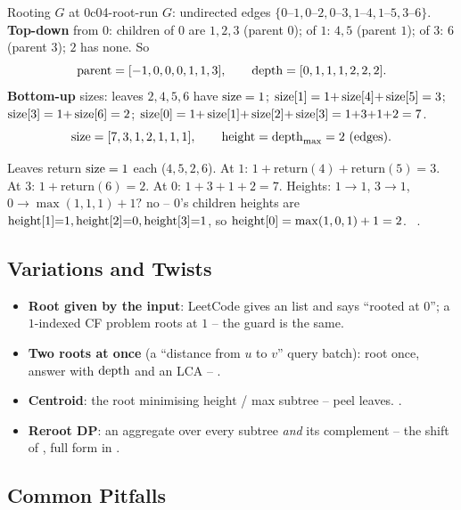 \begin{example}{Rooting $G$ at $0$}{c04-root-run}
$G$: undirected edges $\{0\text{--}1,0\text{--}2,0\text{--}3,1\text{--}4,1\text{--}5,3\text{--}6\}$.
\textbf{Top-down} from $0$: children of $0$ are $1,2,3$ (parent $0$); of $1$: $4,5$
(parent $1$); of $3$: $6$ (parent $3$); $2$ has none. So
\[
  \operatorname{parent}=[-1,0,0,0,1,1,3],\qquad \operatorname{depth}=[0,1,1,1,2,2,2].
\]
\textbf{Bottom-up} sizes: leaves $2,4,5,6$ have $\operatorname{size}=1$; $\operatorname{size}[1]=1{+}\operatorname{size}[4]{+}\operatorname{size}[5]=3$;
$\operatorname{size}[3]=1{+}\operatorname{size}[6]=2$; $\operatorname{size}[0]=1{+}\operatorname{size}[1]{+}\operatorname{size}[2]{+}\operatorname{size}[3]=1{+}3{+}1{+}2=7$.
\[
  \operatorname{size}=[7,3,1,2,1,1,1],\qquad \operatorname{height}=\operatorname{depth}_{\max}=2 \text{ (edges)} .
\]
\end{example}
\begin{tracebox}
Leaves return $\operatorname{size}=1$ each ($4,5,2,6$). At $1$: $1 + \text{return}(4) + \text{return}(5) = 3$.
At $3$: $1 + \text{return}(6) = 2$. At $0$: $1 + 3 + 1 + 2 = 7$. Heights: $1\!\to\!1$,
$3\!\to\!1$, $0\!\to\!\max(1,1,1){+}1?$ no -- $0$'s children heights are $\operatorname{height}[1]{=}1,
\operatorname{height}[2]{=}0, \operatorname{height}[3]{=}1$, so $\operatorname{height}[0]=\max(1,0,1)+1=2$. \checkmark\ .
\end{tracebox}

\subsection{Variations and Twists}

\begin{itemize}[nosep]
  \item \textbf{Root given by the input}: LeetCode gives an  list and says
        ``rooted at $0$''; a $1$-indexed CF problem roots at $1$ -- the guard is the same. \hfill{}
  \item \textbf{Two roots at once} (a ``distance from $u$ to $v$'' query batch): root once,
        answer with $\operatorname{depth}$ and an LCA -- .                     \hfill{}
  \item \textbf{Centroid}: the root minimising height / max subtree -- peel leaves.
        .                                            \hfill{}
  \item \textbf{Reroot DP}: an aggregate over every subtree \emph{and} its complement --
        the shift of , full form in .         \hfill{}
\end{itemize}

\subsection{Common Pitfalls}\label{sec:c04-rooting-pitfalls}

